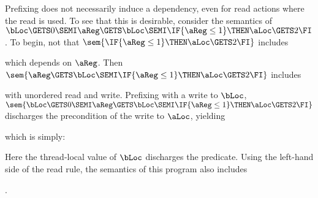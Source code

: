 Prefixing does not necessarily induce a
dependency, even for read actions where the read is used.  To see that this
is desirable, consider  the semantics of
$\bLoc\GETS0\SEMI\aReg\GETS\bLoc\SEMI\IF{\aReg\leq1}\THEN \aLoc\GETS 2\FI$.
To begin, not that 
$\sem{\IF{\aReg\leq1}\THEN \aLoc\GETS 2\FI}$ includes
\begin{tikzinline}[node distance=1em]
\end{tikzinline}
which depends on $\aReg$.
Then $\sem{\aReg\GETS\bLoc\SEMI\IF{\aReg\leq1}\THEN \aLoc\GETS 2\FI}$ includes
\begin{tikzdisplay}[node distance=1em]
\end{tikzdisplay}
with unordered read and write.
Prefixing with a write to $\bLoc$, $\sem{\bLoc\GETS0\SEMI\aReg\GETS\bLoc\SEMI\IF{\aReg\leq1}\THEN \aLoc\GETS
  2\FI}$ discharges the precondition of the write to $\aLoc$, yielding
\begin{tikzinline}[node distance=1em]
\end{tikzinline}
which is simply:
\begin{tikzdisplay}[node distance=1em]
\end{tikzdisplay}
Here the thread-local value of $\bLoc$ discharges the predicate.
Using the left-hand side of the read rule, the semantics of this program also includes
\begin{tikzinline}[node distance=1em]
\end{tikzinline}.

